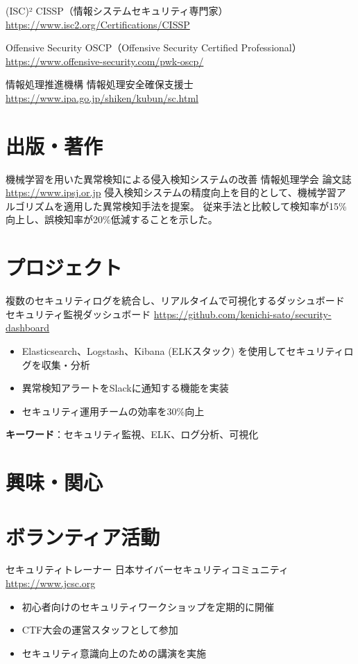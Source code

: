\documentclass[a4paper, serif, 10pt]{moderncv}
\begin{document}
        {(ISC)²}
        {CISSP（情報システムセキュリティ専門家）}
        {\url{https://www.isc2.org/Certifications/CISSP}}
        {}
        {}

        {Offensive Security}
        {OSCP（Offensive Security Certified Professional）}
        {\url{https://www.offensive-security.com/pwk-oscp/}}
        {}
        {}

        {情報処理推進機構}
        {情報処理安全確保支援士}
        {\url{https://www.ipa.go.jp/shiken/kubun/sc.html}}
        {}
        {}
\section{出版・著作}

        {機械学習を用いた異常検知による侵入検知システムの改善}
        {情報処理学会 論文誌}
        {\url{https://www.ipsj.or.jp}}
        {}
        {侵入検知システムの精度向上を目的として、機械学習アルゴリズムを適用した異常検知手法を提案。
従来手法と比較して検知率が15\%向上し、誤検知率が20\%低減することを示した。}
\section{プロジェクト}

        {複数のセキュリティログを統合し、リアルタイムで可視化するダッシュボード}
        {セキュリティ監視ダッシュボード}
        {\url{https://github.com/kenichi-sato/security-dashboard}}
        {}
        {\begin{itemize}
\item Elasticsearch、Logstash、Kibana (ELKスタック) を使用してセキュリティログを収集・分析
\item 異常検知アラートをSlackに通知する機能を実装
\item セキュリティ運用チームの効率を30\%向上
\end{itemize}
\textbf{キーワード}：セキュリティ監視、ELK、ログ分析、可視化}
\section{興味・関心}

\section{ボランティア活動}

        {セキュリティトレーナー}
        {日本サイバーセキュリティコミュニティ}
        {\url{https://www.jcsc.org}}
        {}
        {\begin{itemize}
\item 初心者向けのセキュリティワークショップを定期的に開催
\item CTF大会の運営スタッフとして参加
\item セキュリティ意識向上のための講演を実施
\end{itemize}}
    
\end{document}
